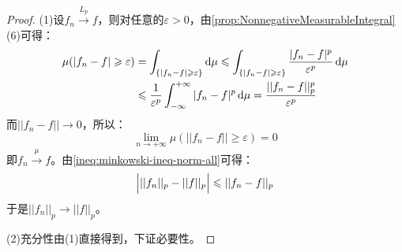 \begin{proof}
	(1)设$f_n\overset{L_p}{\longrightarrow}f$，则对任意的$\varepsilon>0$，由\cref{prop:NonnegativeMeasurableIntegral}(6)可得：
	\begin{align*}
		\mu(|f_n-f|\geqslant\varepsilon)
		&=\int_{\{|f_n-f|\geqslant\varepsilon\}}\mathop{}\!\mathrm{d}\mu\leqslant\int_{\{|f_n-f|\geqslant\varepsilon\}}\frac{|f_n-f|^p}{\varepsilon^p}\mathop{}\!\mathrm{d}\mu \\
		&\leqslant\frac{1}{\varepsilon^p}\int_{-\infty}^{+\infty}|f_n-f|^p\mathop{}\!\mathrm{d}\mu=\frac{||f_n-f||^p_p}{\varepsilon^p}
	\end{align*}
	而$||f_n-f||\to0$，所以：
	\begin{equation*}
		\lim_{n\to+\infty}\mu(||f_n-f||\geqslant\varepsilon)=0
	\end{equation*}
	即$f_n\overset{\mu}{\longrightarrow}f$。由\cref{ineq:minkowski-ineq-norm-all}可得：
	\begin{equation*}
		\Bigl|||f_n||_p-||f||_p\Bigr|\leqslant||f_n-f||_p
	\end{equation*}
	于是$||f_n||_p\to||f||_p$。\par
	(2)充分性由(1)直接得到，下证必要性。
\end{proof}